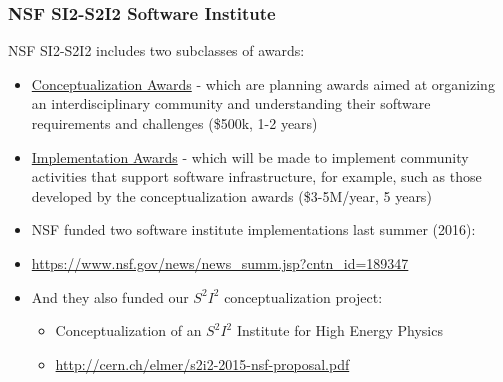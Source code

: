 \begin{frame}
\frametitle{NSF SI2-S2I2 Software Institute}

NSF SI2-S2I2 includes two subclasses of awards:
\begin{itemize}
\item \underline{Conceptualization Awards} - which are planning awards aimed at organizing an interdisciplinary community and understanding their software requirements and challenges (\$500k, 1-2 years)
\item \underline{Implementation Awards} - which will be made to implement community activities that support software infrastructure, for example, such as those developed by the conceptualization awards (\$3-5M/year, 5 years)
\item NSF funded two software institute implementations last summer (2016):
\item \url{https://www.nsf.gov/news/news_summ.jsp?cntn_id=189347}

\item And they also funded our $ S^2 I^2 $ conceptualization project: 
\begin{itemize}
\item Conceptualization of an $ S^2 I^2 $ Institute for High Energy Physics
\item \url{http://cern.ch/elmer/s2i2-2015-nsf-proposal.pdf}
\end{itemize}
\end{itemize}

\end{frame}


